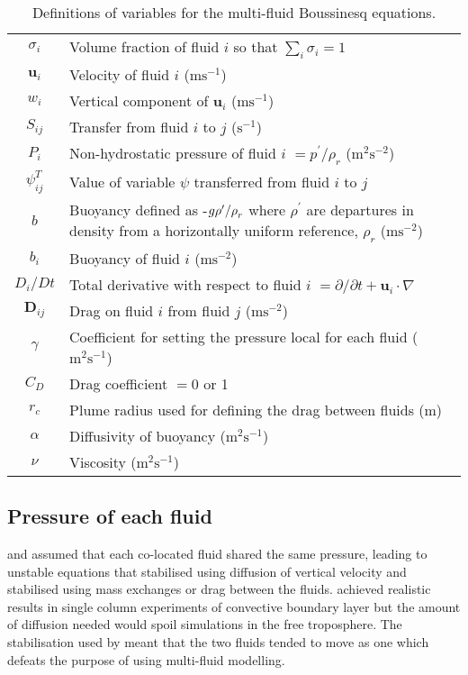 \documentclass[draft]{agujournal2019}
\begin{document}
\begin{table}[h]
\begin{tabular}{c>{\raggedright}p{}}
$\sigma_{i}$ & Volume fraction of fluid $i$ so that $\sum_{i}\sigma_{i}=1$\tabularnewline
$\mathbf{u}_{i}$ & Velocity of fluid $i$ ($\text{m}\text{s}^{-1}$)\tabularnewline
$w_{i}$ & Vertical component of $\mathbf{u}_{i}$ ($\text{m}\text{s}^{-1}$)\tabularnewline
$S_{ij}$ & Transfer from fluid $i$ to $j$ ($\text{s}^{-1}$)\tabularnewline
$P_{i}$ & Non-hydrostatic pressure of fluid $i$ $=p^{\prime}/\rho_{r}$ ($\text{m}^{2}\text{s}^{-2}$)\tabularnewline
$\psi_{ij}^{T}$ & Value of variable $\psi$ transferred from fluid $i$ to $j$\tabularnewline
$b$ & Buoyancy defined as -$g\rho^{\prime}/\text{\ensuremath{\rho}}_{r}$
where $\rho^{\prime}$ are departures in density from a horizontally
uniform reference, $\rho_{r}$ ($\text{m}\text{s}^{-2}$)\tabularnewline
$b_{i}$ & Buoyancy of fluid $i$ ($\text{m}\text{s}^{-2}$)\tabularnewline
$D_{i}\big/Dt$ & Total derivative with respect to fluid $i$ $=\partial/\partial t+\mathbf{u}_{i}\cdot\nabla$\tabularnewline
$\mathbf{D}_{ij}$ & Drag on fluid $i$ from fluid $j$ ($\text{m}\text{s}^{-2}$)\tabularnewline
$\gamma$ & Coefficient for setting the pressure local for each fluid ($\text{m}^{2}\text{s}^{-1}$)\tabularnewline
$C_{D}$ & Drag coefficient $=0$ or 1\tabularnewline
$r_{c}$ & Plume radius used for defining the drag between fluids (m)\tabularnewline
$\alpha$ & Diffusivity of buoyancy ($\text{m}^{2}\text{s}^{-1}$)\tabularnewline
$\nu$ & Viscosity ($\text{m}^{2}\text{s}^{-1}$)\tabularnewline
\end{tabular}

\caption{Definitions of variables for the multi-fluid Boussinesq equations.\label{tab:defns}}
\end{table}


\subsection{Pressure of each fluid \label{subsec:fluidPressure}}

 and  assumed that each co-located fluid
shared the same pressure, leading to unstable equations that 
stabilised using diffusion of vertical velocity and 
stabilised using mass exchanges or drag between the fluids. 
achieved realistic results in single column experiments of convective
boundary layer but the amount of diffusion needed would spoil simulations
in the free troposphere. The stabilisation used by  meant
that the two fluids tended to move as one which defeats the purpose
of using multi-fluid modelling. 
\end{document}
